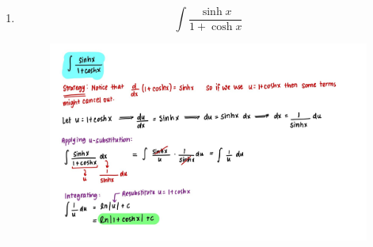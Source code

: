 \documentclass{article}
\begin{document}
\begin{enumerate}
\begin{figure}[H]
        \label{fig:Q1.2}
    \end{figure}
    \newpage
    \item $$\int \frac{\sinh x}{1 + \cosh x}$$
    \begin{figure}[H]
        \centering
        \includegraphics[width=\linewidth]{Q1.3.jpg}
        \label{fig:Q1.3}
    \end{figure}
\end{enumerate}
\end{document}
